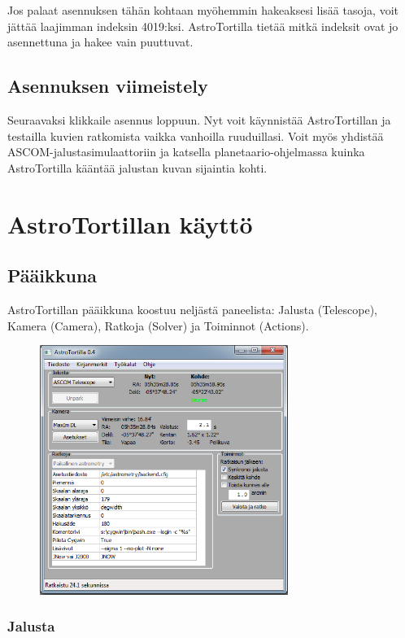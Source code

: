 \documentclass{article}
\begin{document}
Jos palaat asennuksen tähän kohtaan myöhemmin hakeaksesi lisää tasoja, voit jättää laajimman indeksin 4019:ksi. 
AstroTortilla tietää mitkä indeksit ovat jo asennettuna ja hakee vain puuttuvat.

\subsection{Asennuksen viimeistely}

Seuraavaksi klikkaile asennus loppuun. Nyt voit käynnistää AstroTortillan ja testailla kuvien ratkomista vaikka vanhoilla ruuduillasi.
Voit myös yhdistää ASCOM-jalustasimulaattoriin ja katsella planetaario-ohjelmassa kuinka AstroTortilla kääntää jalustan kuvan sijaintia kohti.

\section{AstroTortillan käyttö}

\subsection{Pääikkuna}

AstroTortillan pääikkuna koostuu neljästä paneelista: Jalusta (Telescope), Kamera (Camera), Ratkoja (Solver) ja Toiminnot (Actions).

\begin{figure}[h!]
\centering
\includegraphics[width=0.72\textwidth]{Tortilla-v04-screen-fi.png}
\end{figure}

\subsubsection{Jalusta}
\end{document}
